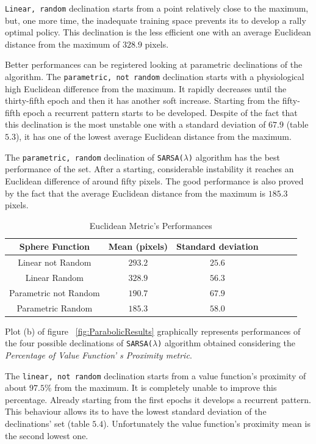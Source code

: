 {\tt Linear, random} declination starts from a point relatively close to the maximum, but, one more time, the inadequate training space prevents its to develop a rally optimal policy. This declination is the less efficient one with an average Euclidean distance from the maximum of $328.9$ pixels.

Better performances can be registered looking at parametric declinations of the algorithm. The {\tt parametric, not random} declination starts with a physiological high Euclidean difference from the maximum. It rapidly decreases until the thirty-fifth epoch and then it has another soft increase. Starting from the fifty-fifth epoch a recurrent pattern starts to be developed. Despite of the fact that this declination is the most unstable one with a standard deviation of $67.9$ (table $5.3$), it has one of the lowest average Euclidean distance from the maximum. 

The {\tt parametric, random} declination of {\tt SARSA($\lambda$)} algorithm has the best performance of the set. After a starting, considerable instability it reaches an Euclidean difference of around fifty pixels. The good performance is also proved by the fact that the average Euclidean distance from the maximum is $185.3$ pixels. \\

\begin{table}[h!]
	\centering
	\resizebox{\linewidth}{!} {
	\begin{tabular}{c| cccccc} 
		\hline \textbf{Sphere Function}
		& \textbf{Mean (pixels)} & \textbf{Standard deviation} \\ 
		\hline Linear not Random
		& $293.2$ &\cellcolor{red!25} $25.6$  \\ 
		\hline Linear Random
		& $328.9$ & $56.3$ \\ 
		\hline Parametric not Random
		& $190.7$ & $67.9$ \\ 
		\hline Parametric Random
		& \cellcolor{red!25} $185.3$ & $58.0$ \\ 
		\hline 
	\end{tabular} 
}
\label{ParabolicTabEuclidean}
\caption{Euclidean Metric's Performances}
\end{table}

Plot (b) of figure ~\ref{fig:ParabolicResults} graphically represents performances of the four possible declinations of {\tt SARSA($\lambda$)} algorithm obtained considering the \textit{Percentage of Value Function' s Proximity metric}. 

The {\tt linear, not random} declination starts from a value function's proximity of about $97.5\%$ from the maximum. It is completely unable to improve this percentage. Already starting from the first epochs it develops a recurrent pattern. This behaviour allows its to have the lowest standard deviation of the declinations' set (table $5.4$). Unfortunately the value function's proximity mean is the second lowest one. 
 
